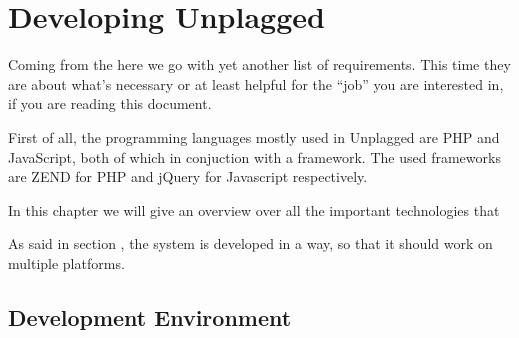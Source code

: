 \chapter{Developing Unplagged}\label{chap:developingUnplagged}

Coming from the  here we go with yet another list of requirements. This time they are about 
what's necessary or at least helpful for the \enquote{job} you are interested in, if you are reading this document.

First of all, the programming languages mostly used in Unplagged are PHP and JavaScript, both of which in conjuction
with a framework. The used frameworks are ZEND for PHP and jQuery for Javascript respectively.

In this chapter we will give an overview over all the important technologies that

As said in section , the system is developed in a way, so that it should work on multiple platforms.

\section{Development Environment}

